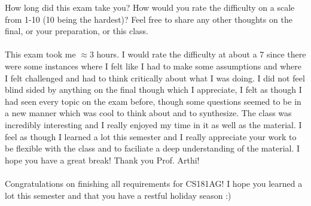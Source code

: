 \documentclass[10pt]{article}
\newenvironment{problem}[2][]{\begin{trivlist}
\item[\hskip \labelsep {\bfseries #1}\hskip \labelsep {\bfseries #2.}]}{\end{trivlist}}
\begin{document}
\begin{problem}{8}
How long did this exam take you? How would you rate the difficulty on a scale from 1-10 (10 being the hardest)? Feel free to share any other thoughts on the final, or your preparation, or this class. \\\\
This exam took me $\approx 3$ hours. I would rate the difficulty at about a 7 since there were some instances where I felt like I had to make some assumptions and where I felt challenged and had to think critically about what I was doing. I did not feel blind sided by anything on the final though which I appreciate, I felt as though I had seen every topic on the exam before, though some questions seemed to be in a new manner which was cool to think about and to synthesize. The class was incredibly interesting and I really enjoyed my time in it as well as the material. I feel as though I learned a lot this semester and I really appreciate your work to be flexible with the class and to faciliate a deep understanding of the material. I hope you have a great break! Thank you Prof. Arthi!\\\\
Congratulations on finishing all requirements for CS181AG! I hope you learned a lot this semester and that you have a restful holiday season :) 



\end{problem}
\end{document}
